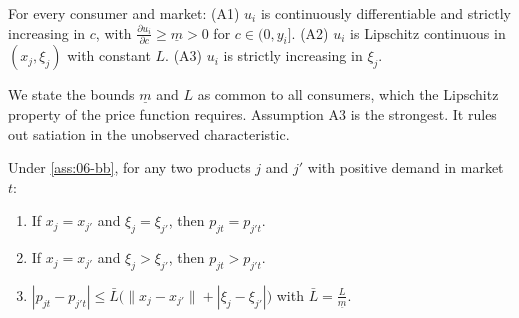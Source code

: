 \begin{assumption}\label{ass:06-bb}
For every consumer and market: (A1) $u_i$ is continuously differentiable and strictly increasing in $c$, with
$\frac{\partial u_i}{\partial c} \ge \underline{m} > 0$ for $c \in (0, y_i]$. (A2) $u_i$ is Lipschitz continuous in $(x_j,
\xi_j)$ with constant $L$. (A3) $u_i$ is strictly increasing in $\xi_j$.
\end{assumption}

We state the bounds $\underline{m}$ and $L$ as common to all consumers, which the Lipschitz property of the price function
requires. Assumption A3 is the strongest. It rules out satiation in the unobserved characteristic.

\begin{theorem}\label{thm:06-bb-pricefn}
Under \cref{ass:06-bb}, for any two products $j$ and $j'$ with positive demand in market $t$:
\begin{enumerate}[label=(\roman*)]
\item If $x_j = x_{j'}$ and $\xi_j = \xi_{j'}$, then $p_{jt} = p_{j't}$.
\item If $x_j = x_{j'}$ and $\xi_j > \xi_{j'}$, then $p_{jt} > p_{j't}$.
\item $|p_{jt} - p_{j't}| \le \bar L\bigl(\lVert x_j - x_{j'} \rVert + |\xi_j - \xi_{j'}|\bigr)$ with $\bar L = \frac{L}{\underline{m}}$.
\end{enumerate}
\end{theorem}

